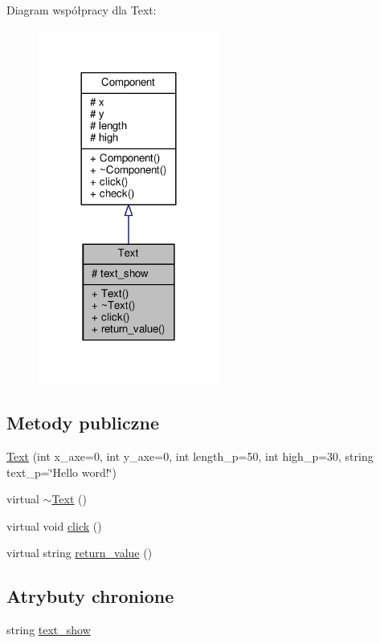Diagram współpracy dla Text\+:
\nopagebreak
\begin{figure}[H]
\begin{center}
\leavevmode
\includegraphics[width=168pt]{classText__coll__graph}
\end{center}
\end{figure}
\subsection*{Metody publiczne}
\begin{DoxyCompactItemize}
\item 
\hyperlink{classText_a144848b3b22ea514fe2f9c61762af5c3}{Text} (int x\+\_\+axe=0, int y\+\_\+axe=0, int length\+\_\+p=50, int high\+\_\+p=30, string text\+\_\+p=\char`\"{}Hello word!\char`\"{})
\item 
virtual \hyperlink{classText_a068e9e04751fc94f4c45c6cb15af55f4}{$\sim$\+Text} ()
\item 
virtual void \hyperlink{classText_ab334ff82f41302f83bebf3eaf2516a84}{click} ()
\item 
virtual string \hyperlink{classText_a6b842bda6a161716fc5aa845fc56187d}{return\+\_\+value} ()
\end{DoxyCompactItemize}
\subsection*{Atrybuty chronione}
\begin{DoxyCompactItemize}
\item 
string \hyperlink{classText_a3fd84b688c6971ba8626b910f0bc2ce3}{text\+\_\+show}
\end{DoxyCompactItemize}


